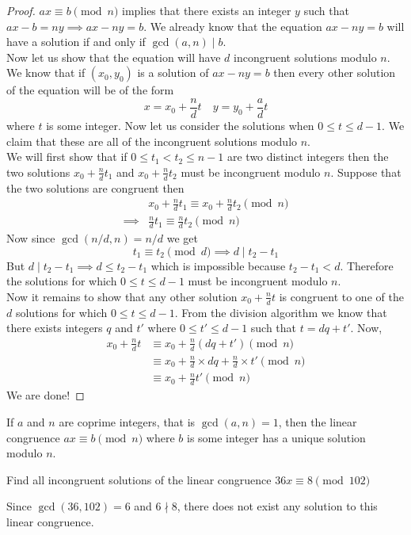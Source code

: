 \begin{proof}
    $ax \equiv b \pmod{n}$ implies that there exists an integer $y$ such that 
    $ax - b = ny \implies ax - ny = b$. We already know that the equation $ax -ny = b$ 
    will have a solution if and only if $\gcd(a, n)\mid b$. \\
    Now let us show that the equation will have $d$ incongruent solutions modulo $n$. 
    We know that if $(x_{0}, y_{0})$ is a solution of $ax -ny = b$ then every other solution 
    of the equation will be of the form
    \[
        x = x_{0} + \frac{n}{d} t \quad y = y_{0} + \frac{a}{d} t
    \]
    where $t$ is some integer. Now let us consider the solutions when $0 \leq t \leq d-1$. 
    We claim that these are all of the incongruent solutions modulo $n$. \\
    We will first show that if $0\leq t_{1} < t_{2}\leq n-1$ are two distinct integers then 
    the two solutions $x_{0} + \frac{n}{d} t_{1}$ and $x_{0} + \frac{n}{d} t_{2}$ must be 
    incongruent modulo $n$. Suppose that the two solutions are congruent then
    \begin{align*}
                 & x_{0} + \frac{n}{d} t_{1} \equiv x_{0} + \frac{n}{d} t_{2} \pmod{n} \\
        \implies & \frac{n}{d} t_{1} \equiv \frac{n}{d} t_{2} \pmod{n}
    \end{align*}
    Now since $\gcd(n/d, n) = n/d$ we get
    \[
        t_{1} \equiv t_{2} \pmod{d} \implies d \mid t_{2} - t_{1} 
    \]
    But $d \mid t_{2} - t_{1} \implies d \leq t_{2} - t_{1}$ which is impossible because 
    $t_{2} - t_{1} < d$. Therefore the solutions for which $0 \leq t \leq d-1$ must be incongruent 
    modulo $n$. \\
    Now it remains to show that any other solution $x_{0} + \frac{n}{d} t$ is congruent to 
    one of the $d$ solutions for which $0 \leq t \leq d-1$. From the division algorithm we 
    know that there exists integers $q$ and $t'$ where $0 \leq t' \leq d-1$ such that 
    $t = dq + t'$. Now,
    \begin{align*}
        x_{0} + \frac{n}{d} t & \equiv x_{0} + \frac{n}{d} (dq + t') \pmod{n} \\
                              & \equiv x_{0} + \frac{n}{d} \times dq + \frac{n}{d} \times t' \pmod{n} \\
                              & \equiv x_{0} + \frac{n}{d} t' \pmod{n}
    \end{align*}
    We are done!
\end{proof}

\begin{corollary}
    If $a$ and $n$ are coprime integers, that is $\gcd(a, n)=1$, then the linear congruence 
    $ax \equiv b \pmod{n}$ where $b$ is some integer has a unique solution modulo $n$.
\end{corollary}

\begin{example}
    Find all incongruent solutions of the linear congruence $36x \equiv 8 \pmod{102}$
\end{example}
\begin{sol}
    Since $\gcd(36, 102) = 6$ and $6 \nmid 8$, there does not exist any solution to this 
    linear congruence.
\end{sol}
